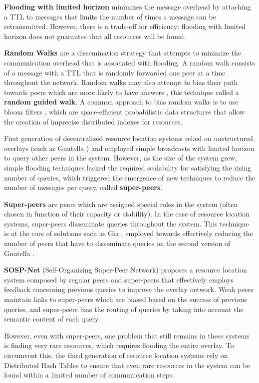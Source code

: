 \textbf{Flooding with limited horizon} minimizes the message overhead by attaching a TTL to messages that limits the number of times a message can be retransmitted. However, there is a trade-off for efficiency: flooding with limited horizon does not guarantee that all resources will be found. 

\textbf{Random Walks} are a dissemination strategy that attempts to minimize the communication overhead that is associated with flooding. A random walk consists of a message with a TTL that is randomly forwarded one peer at a time throughout the network. Random walks may also attempt to bias their path towards peers which are more likely to have answers \cite{1022239}, this technique called a \textbf{random guided walk}. A common approach to bias random walks is to use bloom filters \cite{5751342}, which are space-efficient probabilistic data structures that allow the creation of imprecise distributed indexes for resources.

First generation of decentralized resource location systems relied on unstructured overlays (such as Gnutella \cite{gnutella_gtk}) and employed simple broadcasts with limited horizon to query other peers in the system. However, as the size of the system grew, simple flooding techniques lacked the required scalability for satisfying the rising number of queries, which triggered the emergence of new techniques to reduce the number of messages per query, called \textbf{super-peers}. 

\textbf{Super-peers} are peers which are assigned special roles in the system (often chosen in function of their capacity or stability). In the case of resource location systems, super-peers disseminate queries throughout the system. This technique is at the core of solutions such as Gia \cite{Chawathe2003}, employed towards effectively reducing the number of peers that have to disseminate queries on the second version of Gnutella \cite{gnutella_gtk}. 

\textbf{SOSP-Net} \cite{garbacki2007optimizing} (Self-Organizing Super-Peer Network) proposes a resource location system composed by regular peers and super-peers that effectively employs feedback concerning previous queries to improve the overlay network. Weak peers maintain links to super-peers which are biased based on the success of previous queries, and super-peers bias the routing of queries by taking into account the semantic content of each query. 

However, even with super-peers, one problem that still remains in these systems is finding very rare resources, which requires flooding the entire overlay. To circumvent this, the third generation of resource location systems rely on Distributed Hash Tables to ensure that even rare resources in the system can be found within a limited number of communication steps.

